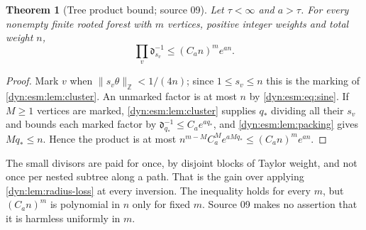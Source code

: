 \documentclass[11pt,letterpaper]{article}
\newtheorem{theorem}{Theorem}[section]
\theoremstyle{definition}
\theoremstyle{remark}
\newcommand{\Z}{\mathbb Z}
\numberwithin{equation}{section}
\begin{document}
\begin{theorem}[Tree product bound; source 09]\label{dyn:esm:thm:treebound}
Let $\tau<\infty$ and $a>\tau$. For every nonempty finite rooted forest with
$m$ vertices, positive integer weights and total weight $n$,
\begin{equation}\label{dyn:esm:eq:treebound}
 \prod_{v}\mathfrak d_{s_v}^{-1}\le(C_an)^{m}e^{an}.
\end{equation}
\end{theorem}
\begin{proof}
Mark $v$ when $\|s_v\theta\|_{\Z}<1/(4n)$; since $1\le s_v\le n$ this is
the marking of \cref{dyn:esm:lem:cluster}. An unmarked factor is at most $n$
by \eqref{dyn:esm:eq:sine}. If $M\ge1$ vertices are marked,
\cref{dyn:esm:lem:cluster} supplies $q_*$ dividing all their $s_v$ and bounds
each marked factor by $\mathfrak d_{q_*}^{-1}\le C_ae^{aq_*}$, and
\cref{dyn:esm:lem:packing} gives $Mq_*\le n$. Hence the product is at most
$n^{m-M}C_a^{M}e^{aMq_*}\le(C_an)^{m}e^{an}$.
\end{proof}

The small divisors are paid for once, by disjoint blocks of Taylor weight,
and not once per nested subtree along a path. That is the gain over
applying \cref{dyn:lem:radius-loss} at every inversion. The inequality holds
for every $m$, but $(C_an)^{m}$ is polynomial in $n$ only for fixed $m$.
Source 09 makes no assertion that it is harmless uniformly in $m$.
\end{document}

